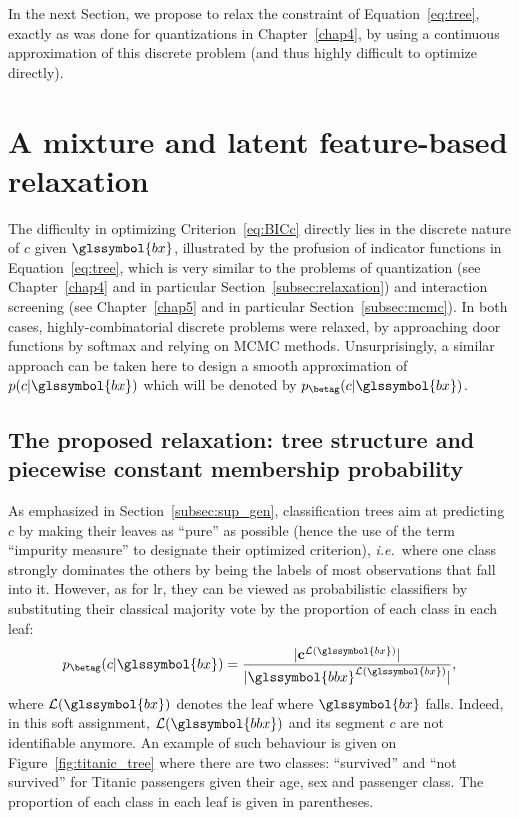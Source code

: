 In the next Section, we propose to relax the constraint of Equation~\eqref{eq:tree}, exactly as was done for quantizations in Chapter~\ref{chap4}, by using a continuous approximation of this discrete problem (and thus highly difficult to optimize directly).


\section{A mixture and latent feature-based relaxation}

The difficulty in optimizing Criterion~\eqref{eq:BICc} directly lies in the discrete nature of $c$ given $\glssymbol{bx}$, illustrated by the profusion of indicator functions in Equation~\eqref{eq:tree}, which is very similar to the problems of quantization (see Chapter~\ref{chap4} and in particular Section~\ref{subsec:relaxation}) and interaction screening (see Chapter~\ref{chap5} and in particular Section~\ref{subsec:mcmc}). In both cases, highly-combinatorial discrete problems were relaxed, by approaching door functions by softmax and relying on MCMC methods. Unsurprisingly, a similar approach can be taken here to design a smooth approximation of $p(c | \glssymbol{bx})$ which will be denoted by $p_{\betag}(c | \glssymbol{bx})$.

\subsection{The proposed relaxation: tree structure and piecewise constant membership probability}

As emphasized in Section~\ref{subsec:sup_gen}, classification trees aim at predicting $c$ by making their leaves as ``pure'' as possible (hence the use of the term ``impurity measure'' to designate their optimized criterion), \textit{i.e.}\ where one class strongly dominates the others by being the labels of most observations that fall into it. However, as for \gls{lr}, they can be viewed as probabilistic classifiers by substituting their classical majority vote by the proportion of each class in each leaf:
\begin{equation}
p_{\betag}(c | \glssymbol{bx}) = \frac{|\mathbf{c}^{\mathcal{L}(\glssymbol{bx})}|}{|\glssymbol{bbx}^{\mathcal{L}(\glssymbol{bx})}|},
\end{equation}
where $\mathcal{L}(\glssymbol{bx})$ denotes the leaf where $\glssymbol{bx}$ falls. Indeed, in this soft assignment, $\mathcal{L}(\glssymbol{bbx})$ and its segment $c$ are not identifiable anymore. An example of such behaviour is given on Figure~\ref{fig:titanic_tree} where there are two classes: ``survived'' and ``not survived'' for Titanic passengers given their age, sex and passenger class. The proportion of each class in each leaf is given in parentheses.

